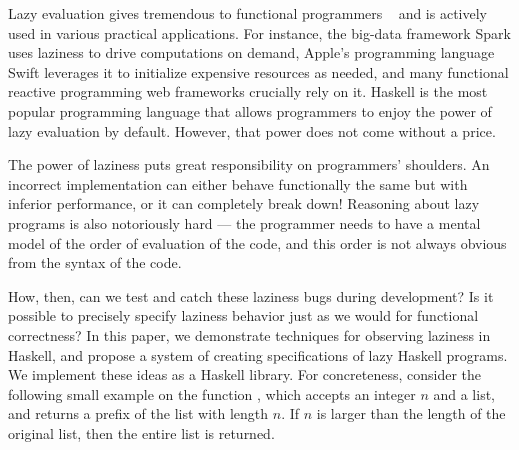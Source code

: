 \documentclass[acmsmall,review]{acmart}\settopmatter{}
\begin{document}
Lazy evaluation gives tremendous  to functional programmers
~\cite{WhyFPMatters} and is actively used in various practical
applications. For instance, the big-data framework Spark uses laziness
to drive computations on demand\cn, Apple's programming language Swift
leverages it to initialize expensive resources as needed\cn, and many
functional reactive programming web frameworks crucially rely on
it\cn {}. Haskell
is the most popular programming language that allows programmers to
enjoy the power of lazy evaluation by default. However, that power
does not come without a price.

The power of laziness puts great responsibility on programmers'
shoulders. An incorrect implementation can either behave functionally
the same but with inferior  performance, or it can completely break
down! Reasoning about lazy programs is also notoriously hard --- the
programmer needs to have a mental model of the order of evaluation of
the code, and this order is not always obvious from the syntax of the
code.

How, then, can we test and catch these laziness bugs during
development? Is it possible to precisely specify laziness behavior
just as we would for functional correctness?
%
In this paper, we demonstrate techniques for observing laziness in
Haskell, and propose a system of creating specifications of lazy
Haskell programs. We implement these ideas as a Haskell library. For
concreteness, consider the following small example on the
function , which accepts an integer $n$ and a list, and returns
a prefix of the list with length $n$. If $n$ is larger than the length
of the original list, then the entire list is returned.
%
%
\end{document}
